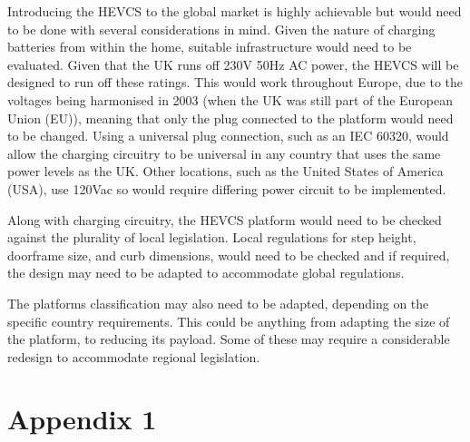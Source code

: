 \documentclass [12pt]{article}
\begin{document}
Introducing the HEVCS to the global market is highly achievable but would need to be done with several considerations in mind.
Given the nature of charging batteries from within the home, suitable infrastructure would need to be evaluated.
Given that the UK runs off 230V 50Hz AC power, the HEVCS will be designed to run off these ratings.
This would work throughout Europe, due to the voltages being harmonised in 2003 (when the UK was still part of the European Union (EU))\cite{UK_Voltage_Change}, meaning that only the plug connected to the platform would need to be changed.
Using a universal plug connection, such as an IEC 60320, would allow the charging circuitry to be universal in any country that uses the same power levels as the UK.
Other locations, such as the United States of America (USA), use 120Vac so would require differing power circuit to be implemented\cite{Voltages_And_Frequencies}.


Along with charging circuitry, the HEVCS platform would need to be checked against the plurality of local legislation.
Local regulations for step height, doorframe size, and curb dimensions, would need to be checked and if required, the design may need to be adapted to accommodate global regulations.


The platforms classification may also need to be adapted, depending on the specific country requirements.
This could be anything from adapting the size of the platform, to reducing its payload.
Some of these may require a considerable redesign to accommodate regional legislation.
\newpage



\newpage
\appendix

\section{Appendix 1}\label{app:appendix_1}
\end{document}

